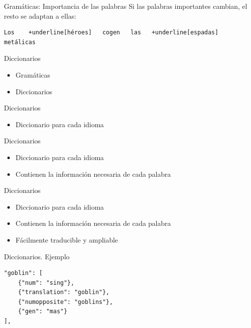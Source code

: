 \begin{frame}[t, fragile]{Gramáticas: Importancia de las palabras}
	Si las palabras importantes cambian, el resto se adaptan a ellas:
	\vspace*{\fill}
		\begin{Verbatim}[commandchars=+\[\]]
Los    +underline[héroes]   cogen   las   +underline[espadas]   metálicas
		\end{Verbatim}
	\vspace*{\fill}
\end{frame}


\begin{tframe}{Diccionarios}
	\begin{itemize}
		\item Gramáticas
		\item<+-| alert@+> Diccionarios
	\end{itemize}
\end{tframe}

\begin{tframe}{Diccionarios}
	\begin{itemize}
		\item<+-| alert@+> Diccionario para cada idioma
	\end{itemize}
\end{tframe}

\begin{tframe}{Diccionarios}
	\begin{itemize}
		\item Diccionario para cada idioma
		\item<+-| alert@+> Contienen la información necesaria de cada palabra
	\end{itemize}
\end{tframe}

\begin{tframe}{Diccionarios}
	\begin{itemize}
		\item Diccionario para cada idioma
		\item Contienen la información necesaria de cada palabra
		\item<+-| alert@+> Fácilmente traducible y ampliable
	\end{itemize}
\end{tframe}

\begin{frame}[t, fragile]{Diccionarios. Ejemplo}
	\begin{Verbatim}
"goblin": [
    {"num": "sing"},
    {"translation": "goblin"},
    {"numopposite": "goblins"},
    {"gen": "mas"}
],
	\end{Verbatim}
\end{frame}

